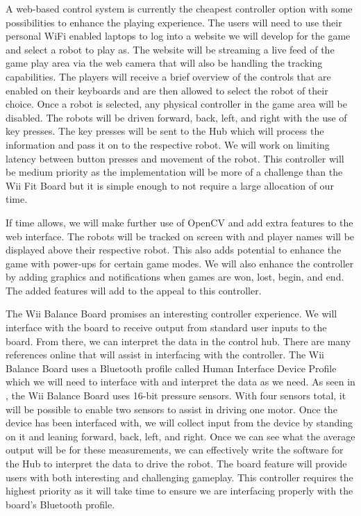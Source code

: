 \documentclass[11pt]{ieeeconf}
\begin{document}
A web-based control system is currently the cheapest controller option with some possibilities to enhance the playing experience. The users will need to use their personal WiFi enabled laptops to log into a website we will develop for the game and select a robot to play as. The website will be streaming a live feed of the game play area via the web camera that will also be handling the tracking capabilities. The players will receive a brief overview of the controls that are enabled on their keyboards and are then allowed to select the robot of their choice. Once a robot is selected, any physical controller in the game area will be disabled. The robots will be driven forward, back, left, and right with the use of key presses. The key presses will be sent to the Hub which will process the information and pass it on to the respective robot. We will work on limiting latency between button presses and movement of the robot. This controller will be medium priority as the implementation will be more of a challenge than the Wii Fit Board but it is simple enough to not require a large allocation of our time.

If time allows, we will make further use of OpenCV and add extra features to the web interface. The robots will be tracked on screen with and player names will be displayed above their respective robot. This also adds potential to enhance the game with power-ups for certain game modes. We will also enhance the controller by adding graphics and notifications when games are won, lost, begin, and end. The added features will add to the appeal to this controller.

The Wii Balance Board promises an interesting controller experience. We will interface with the board to receive output from standard user inputs to the board. From there, we can interpret the data in the control hub. There are many references online that will assist in interfacing with the controller. The Wii Balance Board uses a Bluetooth profile called Human Interface Device Profile which we will need to interface with and interpret the data as we need. As seen in \cite{homebrew}, the Wii Balance Board uses 16-bit pressure sensors. With four sensors total, it will be possible to enable two sensors to assist in driving one motor. Once the device has been interfaced with, we will collect input from the device by standing on it and leaning forward, back, left, and right. Once we can see what the average output will be for these measurements, we can effectively write the software for the Hub to interpret the data to drive the robot. The board feature will provide users with both interesting and challenging gameplay. This controller requires the highest priority as it will take time to ensure we are interfacing properly with the board's Bluetooth profile. 
\end{document}
